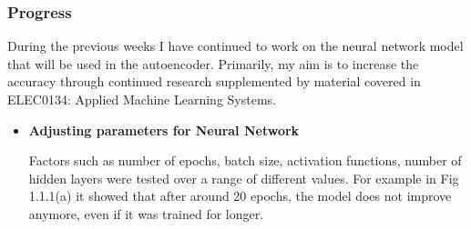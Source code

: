 
\subsubsection{Progress}
During the previous weeks I have continued to work on the neural network model that will be used in the autoencoder. Primarily, my aim is to increase the accuracy through continued research supplemented by material covered in ELEC0134: Applied Machine Learning Systems.
\begin{itemize}
    \item \textbf{Adjusting parameters for Neural Network}
    
    Factors such as number of epochs, batch size, activation functions, number of hidden layers were tested over a range of different values. For example in Fig 1.1.1(a) it showed that after around 20 epochs, the model does not improve anymore, even if it was trained for longer. 
    

\end{itemize}
